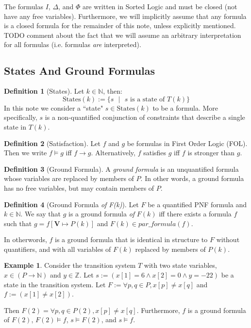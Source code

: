 \documentclass[12pt]{article}
\theoremstyle{definition}
\newtheorem{definition}{Definition}
\newtheorem{example}{Example}
\theoremstyle{remark}
\newcommand{\st}{\text{ }|\text{ }}
\newcommand{\states}{\text{States}}
\begin{document}
The formulas $I$, $\Delta$, and $\Phi$ are written in Sorted Logic and must be closed (not have any free variables).  Furthermore, we will implicitly assume that any formula is a closed formula for the remainder of this note, unless explicitly mentioned.  TODO comment about the fact that we will assume an arbitrary interpretation for all formulas (i.e. formulas \textit{are} interpreted).  %


\subsection{States And Ground Formulas}
\begin{definition}[States]
  Let $k \in \mathbb{N}$, then:
  $$\states(k) := \{s \st s \text{ is a state of } T(k)\}$$
  In this note we consider a ``state" $s \in \states(k)$ to be a formula.  More specifically, $s$ is a non-quantified conjunction of constraints that describe a single state in $T(k)$.
\end{definition}

\begin{definition}[Satisfaction]
  Let $f$ and $g$ be formulas in First Order Logic (FOL).  Then we write $f \models g$ iff $f \rightarrow g$.  Alternatively, $f$ satisfies $g$ iff $f$ is stronger than $g$.
\end{definition}

\begin{definition}[Ground Formula]
  A \textit{ground formula} is an unquantified formula whose variables are replaced by members of $P$.  In other words, a ground formula has no free variables, but may contain members of $P$.
\end{definition}

\begin{definition}[Ground Formula \textit{of F(k)}]
  Let $F$ be a quantified PNF formula and $k \in \mathbb{N}$.  We say that $g$ is a ground formula \textit{of} $F(k)$ iff there exists a formula $f$ such that $g = f[\mathbf{V} \mapsto P(k)]$ and $F(k) \in par\_formula(f)$.

  In otherwords, $f$ is a ground formula that is identical in structure to $F$ without quantifiers, and with all variables of $F(k)$ replaced by members of $P(k)$.
\end{definition}

\begin{example}
  Consider the transition system $T$ with two state variables, $x \in (P \to \mathbb{N})$ and $y \in \mathbb{Z}$.  Let $s := (x[1]=6 \land x[2]=0 \land y=-22)$ be a state in the transition system.  Let $F := \forall p,q \in P, x[p] \neq x[q]$ and $f := (x[1] \neq x[2])$.

  Then $F(2) = \forall p,q \in P(2), x[p] \neq x[q]$.  Furthermore, $f$ is a ground formula of $F(2)$, $F(2) \models f$, $s \models F(2)$, and $s \models f$.
\end{example}
\end{document}
